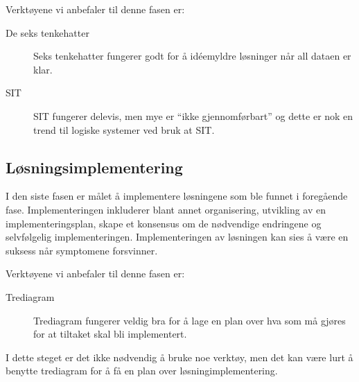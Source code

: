 Verktøyene vi anbefaler til denne fasen er:
\begin{description}
    \item[De seks tenkehatter] Seks tenkehatter fungerer godt for å idéemyldre løsninger når all dataen er klar.
    \item[SIT] SIT fungerer delevis, men mye er ``ikke gjennomførbart'' og dette er nok en trend til logiske systemer ved bruk at SIT.
\end{description}

\subsection{Løsningsimplementering}
I den siste fasen er målet å implementere løsningene som ble funnet i foregående fase. Implementeringen inkluderer blant annet organisering, utvikling av en implementeringsplan, skape et konsensus om de nødvendige endringene og selvfølgelig implementeringen. Implementeringen av løsningen kan sies å være en suksess når symptomene forsvinner. 

Verktøyene vi anbefaler til denne fasen er:
\begin{description}
    \item[Trediagram] Trediagram fungerer veldig bra for å lage en plan over hva som må gjøres for at tiltaket skal bli implementert. 
\end{description}
I dette steget er det ikke nødvendig å bruke noe verktøy, men det kan være lurt å benytte trediagram for å få en plan over løsningimplementering.

